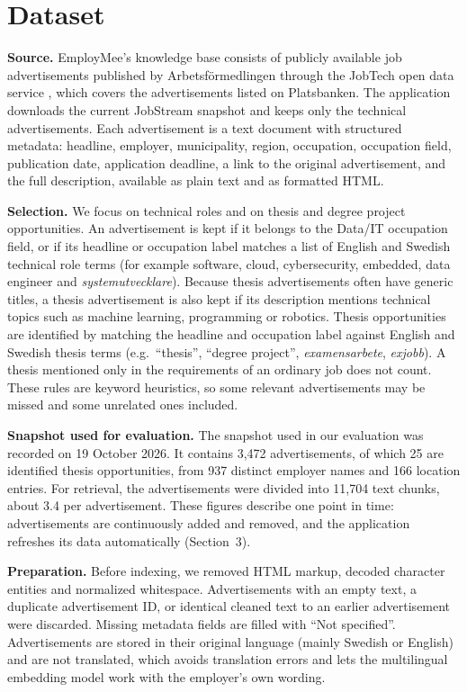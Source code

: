 \documentclass[a4paper,10pt]{article}
\begin{document}
\section{Dataset}

\textbf{Source.}
EmployMee's knowledge base consists of publicly available job advertisements published by Arbetsf\"ormedlingen through the JobTech open data service \cite{jobtech}, which covers the advertisements listed on Platsbanken. The application downloads the current JobStream snapshot and keeps only the technical advertisements. Each advertisement is a text document with structured metadata: headline, employer, municipality, region, occupation, occupation field, publication date, application deadline, a link to the original advertisement, and the full description, available as plain text and as formatted HTML.

\textbf{Selection.}
We focus on technical roles and on thesis and degree project opportunities. An advertisement is kept if it belongs to the Data/IT occupation field, or if its headline or occupation label matches a list of English and Swedish technical role terms (for example software, cloud, cybersecurity, embedded, data engineer and \textit{systemutvecklare}). Because thesis advertisements often have generic titles, a thesis advertisement is also kept if its description mentions technical topics such as machine learning, programming or robotics. Thesis opportunities are identified by matching the headline and occupation label against English and Swedish thesis terms (e.g.\ ``thesis'', ``degree project'', \textit{examensarbete}, \textit{exjobb}). A thesis mentioned only in the requirements of an ordinary job does not count. These rules are keyword heuristics, so some relevant advertisements may be missed and some unrelated ones included.

\textbf{Snapshot used for evaluation.}
The snapshot used in our evaluation was recorded on 19 October 2026. It contains 3,472 advertisements, of which 25 are identified thesis opportunities, from 937 distinct employer names and 166 location entries. For retrieval, the advertisements were divided into 11,704 text chunks, about 3.4 per advertisement. These figures describe one point in time: advertisements are continuously added and removed, and the application refreshes its data automatically (Section~3).

\textbf{Preparation.}
Before indexing, we removed HTML markup, decoded character entities and normalized whitespace. Advertisements with an empty text, a duplicate advertisement ID, or identical cleaned text to an earlier advertisement were discarded. Missing metadata fields are filled with ``Not specified''. Advertisements are stored in their original language (mainly Swedish or English) and are not translated, which avoids translation errors and lets the multilingual embedding model work with the employer's own wording.
\end{document}

